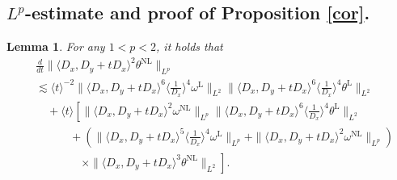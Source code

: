 \documentclass[reqno, 12pt]{amsart} %
\theoremstyle{plain} %
\newtheorem{Lem}[Thm]{Lemma}     %
\theoremstyle{definition}
\theoremstyle{remark}
\numberwithin{equation}{section} %
\newcommand{\lt}{\left}
\newcommand{\rt}{\right}
\begin{document}
	\subsection{$L^p$-estimate and proof of Proposition \ref{cor}.}
	\begin{Lem} \label{lem:temp1}
		For any $1<p<2$, it holds that
		$$
		\begin{aligned}
			& \frac{d}{d t}\|\langle D_x, D_y+t D_x\rangle^2 \theta^{\mathrm{NL}}\|_{L^p} \\
			&\lesssim   \langle t\rangle^{-2}  \|\langle D_x, D_y+t D_x\rangle^6 \langle\frac{1}{D_x}\rangle^4 \omega^{\mathrm{L}}\|_{L^2}  \|\langle D_x, D_y+t D_x\rangle^6 \langle\frac{1}{D_x}\rangle^4 \theta^{\mathrm{L}}\|_{L^2} \\
			& \quad+\langle t\rangle\left[ \|\langle D_x, D_y+t D_x\rangle^2 \omega^{\mathrm{NL}}\|_{L^p}\|\langle D_x, D_y+t D_x\rangle^6 \langle\frac{1}{D_x}\rangle^4 \theta^{\mathrm{L}}\|_{L^2}\right. \\
			& \left.\qquad \quad+(\|\langle D_x, D_y+t D_x\rangle^5 \langle\frac{1}{D_x}\rangle^4 \omega^{\mathrm{L}}\|_{L^p}+\|\langle D_x, D_y+t D_x\rangle^2 \omega^{\mathrm{NL}}\|_{L^p})\rt. \\
			&\lt. \qquad \qquad\times \|\langle D_x, D_y+t D_x\rangle^3 \theta^{\mathrm{NL}}\|_{L^2} \right].
		\end{aligned}
		$$
	\end{Lem}
\end{document}
